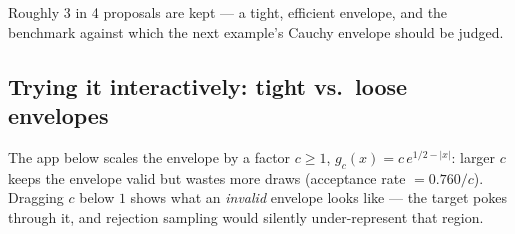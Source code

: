 \documentclass[
  letterpaper,
  DIV=11,
  numbers=noendperiod]{scrreprt}
\begin{document}
Roughly 3 in 4 proposals are kept --- a tight, efficient envelope, and
the benchmark against which the next example's Cauchy envelope should be
judged.

\subsection{Trying it interactively: tight vs.~loose
envelopes}\label{trying-it-interactively-tight-vs.-loose-envelopes}

The app below scales the envelope by a factor \(c \ge 1\),
\(g_c(x) = c\, e^{1/2-|x|}\): larger \(c\) keeps the envelope valid but
wastes more draws (acceptance rate \(= 0.760/c\)). Dragging \(c\) below
\(1\) shows what an \emph{invalid} envelope looks like --- the target
pokes through it, and rejection sampling would silently under-represent
that region.
\end{document}
